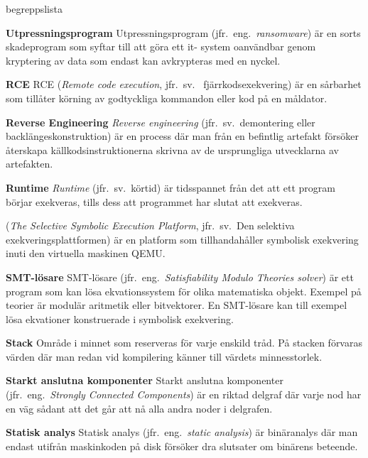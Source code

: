 \begin{labeling}{begreppslista}
    \item [\textbf{Utpressningsprogram}] Utpressningsprogram (jfr.\ eng.\
    \emph{ransomware}) är en sorts skadeprogram som syftar till att göra ett it-
    system oanvändbar genom kryptering av data som endast kan avkrypteras med
    en nyckel.

    \item [\textbf{RCE}] RCE (\emph{Remote code execution}, jfr.\ sv.
    \ fjärrkodsexekvering) är en sårbarhet som tillåter körning av
    godtyckliga kommandon eller kod på en måldator.

    \item [\textbf{Reverse Engineering}] \emph{Reverse engineering} (jfr.\ sv.\
    demontering eller backlängeskonstruktion) är en process där man från en
    befintlig artefakt försöker återskapa källkodsinstruktionerna
    skrivna av de ursprungliga utvecklarna av artefakten.

    \item [\textbf{Runtime}] \emph{Runtime} (jfr.\ sv.\ körtid) är tidsspannet
    från det att ett program börjar exekveras, tills dess att programmet har
    slutat att exekveras.

    \item [\textbf{\stoe}] \stoe (\emph{The Selective Symbolic Execution
        Platform}, jfr.\ sv.\ Den selektiva exekveringsplattformen) är
    en platform som tillhandahåller symbolisk exekvering inuti den virtuella
    maskinen QEMU.\@

    \item [\textbf{SMT-lösare}] SMT-lösare (jfr.\ eng.\ \emph{Satisfiability Modulo
        Theories solver}) är ett program som kan lösa
    ekvationssystem för olika matematiska objekt. Exempel på
    teorier är modulär aritmetik eller bitvektorer. En SMT-lösare
    kan till exempel lösa ekvationer konstruerade i symbolisk
    exekvering.

    \item [\textbf{Stack}] Område i minnet som reserveras för varje
    enskild tråd. På stacken förvaras värden där man redan vid
    kompilering känner till värdets minnesstorlek.

    \item [\textbf{Starkt anslutna komponenter}] Starkt anslutna komponenter
    (jfr.\ eng.\ \emph{Strongly Connected Components}) är en riktad delgraf där
    varje nod har en väg sådant att det går att nå alla andra noder i delgrafen.

    \item [\textbf{Statisk analys}] Statisk analys (jfr.\ eng.\ \emph{static
        analysis}) är binäranalys där man endast utifrån maskinkoden på disk
    försöker dra slutsater om binärens beteende.


\end{labeling}
